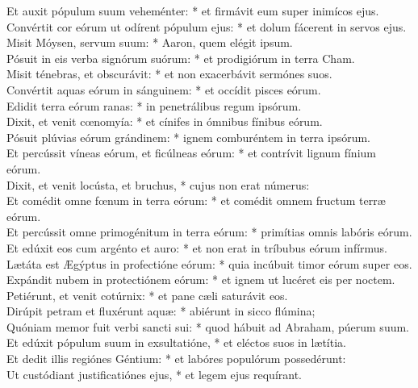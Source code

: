 {	Et auxit pópulum suum veheménter: * et firmávit eum super inimícos ejus. \\
	Convértit cor eórum ut odírent pópulum ejus: * et dolum fácerent in servos ejus. \\
	Misit Móysen, servum suum: * Aaron, quem elégit ipsum. \\
	Pósuit in eis verba signórum suórum: * et prodigiórum in terra Cham. \\
	Misit ténebras, et obscurávit: * et non exacerbávit sermónes suos. \\
	Convértit aquas eórum in sánguinem: * et occídit pisces eórum. \\
	Edidit terra eórum ranas: * in penetrálibus regum ipsórum. \\
	Dixit, et venit cœnomyía: * et cínifes in ómnibus fínibus eórum. \\
	Pósuit plúvias eórum grándinem: * ignem comburéntem in terra ipsórum. \\
	Et percússit víneas eórum, et ficúlneas eórum: * et contrívit lignum fínium eórum. \\
	Dixit, et venit locústa, et bruchus, * cujus non erat númerus: \\
	Et comédit omne fœnum in terra eórum: * et comédit omnem fructum terræ eórum. \\
	Et percússit omne primogénitum in terra eórum: * primítias omnis labóris eórum. \\
	Et edúxit eos cum argénto et auro: * et non erat in tríbubus eórum infírmus. \\
	Lætáta est Ægýptus in profectióne eórum: * quia incúbuit timor eórum super eos. \\
	Expándit nubem in protectiónem eórum: * et ignem ut lucéret eis per noctem. \\
	Petiérunt, et venit cotúrnix: * et pane cæli saturávit eos. \\
	Dirúpit petram et fluxérunt aquæ: * abiérunt in sicco flúmina; \\
	Quóniam memor fuit verbi sancti sui: * quod hábuit ad Abraham, púerum suum. \\
	Et edúxit pópulum suum in exsultatióne, * et eléctos suos in lætítia. \\
	Et dedit illis regiónes Géntium: * et labóres populórum possedérunt: \\
	Ut custódiant justificatiónes ejus, * et legem ejus requírant. \\
}


